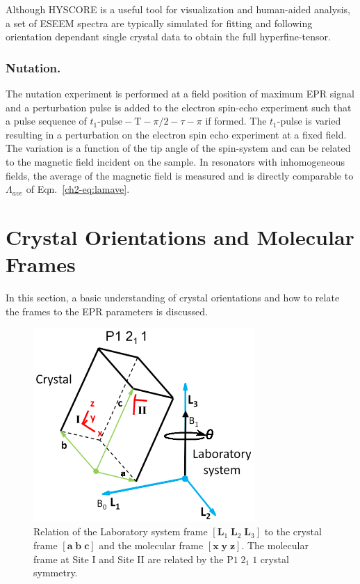 Although HYSCORE is a useful tool for visualization and human-aided analysis, a set of ESEEM spectra are typically simulated for fitting and following orientation dependant single crystal data to obtain the full hyperfine-tensor. \cite{Shane1994SingleCrystalESEEM}

\subsubsection*{Nutation.}
The nutation experiment is performed at a field position of maximum EPR signal and a perturbation pulse is added to the electron spin-echo experiment such that a pulse sequence of ${t_1\text{-pulse}\!-\!\text{T}\!-\!\pi/2\!-\!\tau\!-\!\pi}$ if formed. The $t_1$-pulse is varied resulting in a perturbation on the electron spin echo experiment at a fixed field. The variation is a function of the tip angle of the spin-system and can be related to the magnetic field incident on the sample. In resonators with inhomogeneous fields, the average of the magnetic field is measured and is directly comparable to $\Lambda_{ave}$ of Eqn.~\ref{ch2-eq:lamave}.

\section{Crystal Orientations and Molecular Frames}
In this section, a basic understanding of crystal orientations and how to relate the frames to the EPR parameters is discussed. 

\begin{figure}[ht]
 \centering
 \includegraphics[width=0.75\textwidth]{Kapitel/Ch1-images/CrystalRotation.eps}
 \caption[Single crystal EPR frames.]{Relation of the Laboratory system frame $[\mathbf{L}_1\; \mathbf{L}_2\; \mathbf{L}_3]$ to the crystal frame $[\mathbf{a}\; \mathbf{b}\; \mathbf{c}]$ and the molecular frame $[\mathbf{x}\; \mathbf{y}\; \mathbf{z}]$. The molecular frame at Site I and Site II are related by the P$1\;2_1\;1$ crystal symmetry.}
 \label{fig:CrystalOrientation}
\end{figure}

